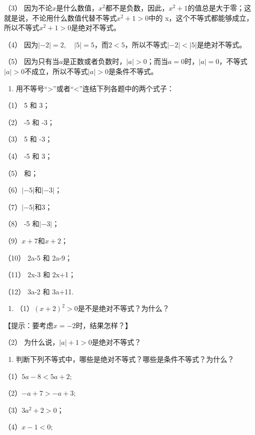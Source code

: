 （3）
因为不论\(x\)是什么数值，\(x^2\)都不是负数，因此，\(x^{2}+1\)的值总是大于零；这就是说，不论用什么数值代替不等式\(x^{2}+1>0\)中的
x，这个不等式都能够成立，所以不等式\(x^{2}+1>0\)是绝对不等式。

（4）
因为\(\left|-2\right|=2,\quad\left|5\right|=5\)，而\(2<5\)，所以不等式\(\left|-2\right|<\left|5\right|\)是绝对不等式。

（5）
因为只有当\(a\)是正数或者负数时，\(|a| > 0\)；而当\(a = 0\)时，\(|a| = 0\)，不等式\(|a| > 0\)不成立，所以不等式\(|a| > 0\)是条件不等式。

\begin{enumerate}
\item
  用不等号``\textgreater''或者``\textless''连结下列各题中的两个式子：
\end{enumerate}

（1） 5 和 3；

（2） -5 和 -3；

（3） 5 和 -3；

（4） -5 和 3；

（5） \textbar 和\textbar；

（6）\(|-5|\)和\(|-3|\)；

（7）\(|-5|\)和3；

（8） -5 和\(\left|-3\right|\)；

（9）\(x + 7\)和\(x + 2\)；

（10） 2a-5 和 2a-9；

（11） 2x-3 和 2x+1；

（12） 3a-2 和 3a+11.

\begin{enumerate}[start=2]
\item
  （1）\((x + 2)^{2} > 0\)是不是绝对不等式？为什么？
\end{enumerate}

【提示：要考虑\(x = -2\)时，结果怎样？】

（2） 为什么说，\(|a|+1>0\)是绝对不等式？

\begin{enumerate}[start=3]
\item
  判断下列不等式中，哪些是绝对不等式？哪些是条件不等式？为什么？
\end{enumerate}

（1）\(5a - 8 < 5a + 2;\)

（2）\(-a + 7 > -a + 3;\)

（3）\(3a^{2} + 2 > 0\)；

（4）\(x - 1 <   0;\)

